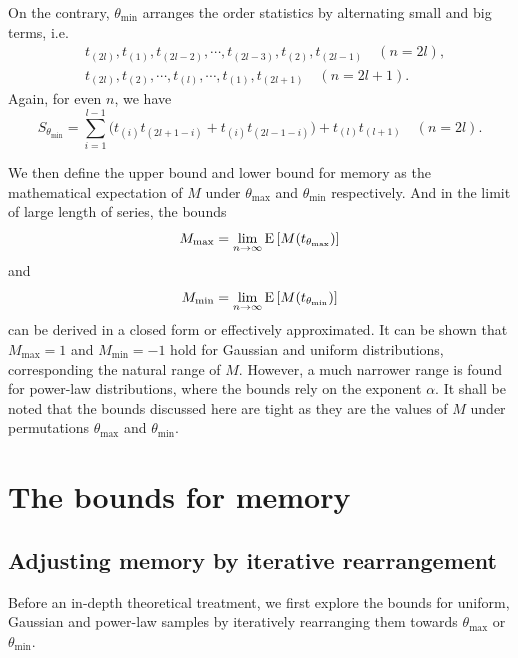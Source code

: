  
On the contrary, $ \theta_{\min} $ arranges the order statistics by alternating small and big terms, i.e.
\begin{equation}
\begin{split}
&t_{(2l)}, t_{(1)}, t_{(2l-2)}, \cdots, t_{(2l-3)}, t_{(2)}, t_{(2l-1)} \quad (n=2l), \\
&t_{(2l)}, t_{(2)}, \cdots, t_{(l)}, \cdots, t_{(1)}, t_{(2l+1)} \quad (n=2l+1).
\end{split} \label{eqs:minArrange}
\end{equation}
Again, for even $ n $, we have
\begin{equation}
	S_{\theta_{\min}} = \sum_{i=1}^{l-1} \big( t_{(i)}t_{(2l+1-i)} + t_{(i)}t_{(2l-1-i)} \big) + t_{(l)}t_{(l+1)} \quad (n=2l).
\end{equation}

We then define the upper bound and lower bound for memory as the mathematical expectation of $ M $ under $ \theta_{\max} $  and $ \theta_{\min} $ respectively. And in the limit of large length of series, the bounds 
\begin{equation}
M_{\max} = \lim_{n \rightarrow \infty}\E{[M(t_{\theta_{\max}})]}
\end{equation}
and
\begin{equation}
M_{\min} = \lim_{n \rightarrow \infty}\E{[M(t_{\theta_{\min}})]}
\end{equation}
can be derived in a closed form or effectively approximated. It can be shown that $ M_{\max}=1 $ and $ M_{\min}=-1 $ hold for Gaussian and uniform distributions, corresponding the natural range of $ M $. However, a much narrower range is found for power-law distributions, where the bounds rely on the exponent $ \alpha $. It shall be noted that the bounds discussed here are tight as they are the values of $ M $ under permutations $ \theta_{\max} $ and $ \theta_{\min} $.

\section{The bounds for memory}
\subsection{Adjusting memory by iterative rearrangement}
Before an in-depth theoretical treatment, we first explore the bounds for uniform, Gaussian and power-law samples by iteratively rearranging them towards $ \theta_{\max} $ or $ \theta_{\min} $. 

